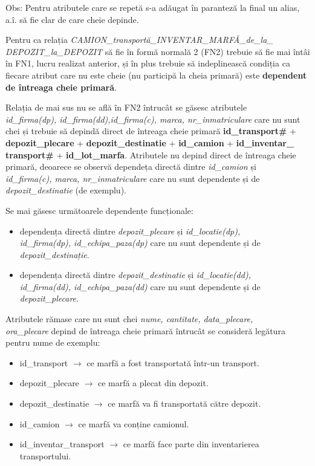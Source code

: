 \documentclass[12pt, a4paper]{article}
\begin{document}
Obs: Pentru atributele care se repetă s-a adăugat în paranteză la final un alias, a.î. să fie clar de care cheie depinde.

Pentru ca relația \emph{CAMION\_transportă\_INVENTAR\_MARFĂ\_de\_la\_\\DEPOZIT\_la\_DEPOZIT} să fie în formă normală 2 (FN2) trebuie să fie mai întâi în FN1, lucru realizat anterior, și în plus trebuie să indeplinească condiția ca fiecare atribut care nu este cheie (nu participă la cheia primară) este \textbf{dependent de întreaga cheie primară}.

Relația de mai sus nu se află în FN2 întrucât se găsesc atributele \\\emph{id\_firma(dp), id\_firma(dd),id\_firma(c), marca, nr\_inmatriculare} care nu sunt chei și trebuie să depindă direct de întreaga cheie primară \textbf{id\_transport\#} + \textbf{depozit\_plecare} + \textbf{depozit\_destinatie} + \textbf{id\_camion} + \textbf{id\_inventar\_\\transport\#} + \textbf{id\_lot\_marfa}.
Atributele nu depind direct de întreaga cheie primară, deoarece se observă dependeța directă dintre \emph{id\_camion} și \\\emph{id\_firma(c), marca, nr\_inmatriculare} care nu sunt dependente și de \\\emph{depozit\_destinatie} (de exemplu).

Se mai găsesc următoarele dependențe funcționale:
\begin{itemize}
    \item dependența directă dintre \emph{depozit\_plecare} și \emph{id\_locatie(dp), \\id\_firma(dp), id\_echipa\_paza(dp)} care nu sunt dependente și de \\\emph{depozit\_destinație}.
    \item dependența directă dintre \emph{depozit\_destinatie} și \emph{id\_locatie(dd), \\id\_firma(dd), id\_echipa\_paza(dd)} care nu sunt dependente și de \\\emph{depozit\_plecare}.
\end{itemize}

Atributele rămase care nu sunt chei \emph{nume, cantitate, data\_plecare, \\ora\_plecare} depind de întreaga cheie primară întrucât se consideră legătura pentru nume de exemplu:
\begin{itemize}
    \item id\_transport $\rightarrow$ ce marfă a fost transportată într-un transport.
    \item depozit\_plecare $\rightarrow$ ce marfă a plecat din depozit.
    \item depozit\_destinatie $\rightarrow$ ce marfă va fi transportată către depozit.
    \item id\_camion $\rightarrow$ ce marfă va conține camionul.
    \item id\_inventar\_transport $\rightarrow$ ce marfă face parte din inventarierea transportului.
\end{itemize}
\end{document}
